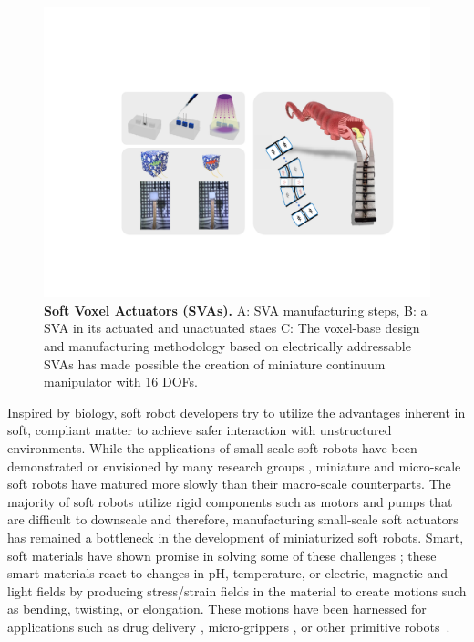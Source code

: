 \section{}
\begin{figure}[t]
      \centering
      \includegraphics[width=\textwidth]{concept4.pdf}
      \caption[]{\textbf{Soft Voxel Actuators (SVAs).} A: SVA manufacturing steps, B: a SVA in its actuated and unactuated staes C: The voxel-base design and manufacturing methodology based on electrically addressable SVAs has made possible the creation of miniature continuum manipulator with 16 DOFs.}
      \label{fig:conceptSVA}
\end{figure}
Inspired by biology, soft robot developers try to utilize the advantages inherent in soft, compliant matter to achieve safer interaction with unstructured environments.  
While the applications of small-scale soft robots have been demonstrated or envisioned by many research groups \cite{Hines2017}, miniature and micro-scale soft robots have matured more slowly than their  macro-scale counterparts. The majority of soft robots utilize rigid components such as motors and pumps that are difficult to downscale \cite{Majidi2019} and therefore, manufacturing small-scale soft actuators has remained a bottleneck in the development of miniaturized soft robots. Smart, soft materials have shown promise in solving some of these challenges \cite{Steele2018, Stuart2010, White2013}; these smart materials react to changes in pH, temperature, or electric, magnetic and light fields by producing stress/strain fields in the material to create motions such as bending, twisting, or elongation. These motions have been harnessed for applications such as drug delivery \cite{ghosh2017}, micro-grippers \cite{shintake2018}, or other primitive robots~\cite{Ionov2014}. %
